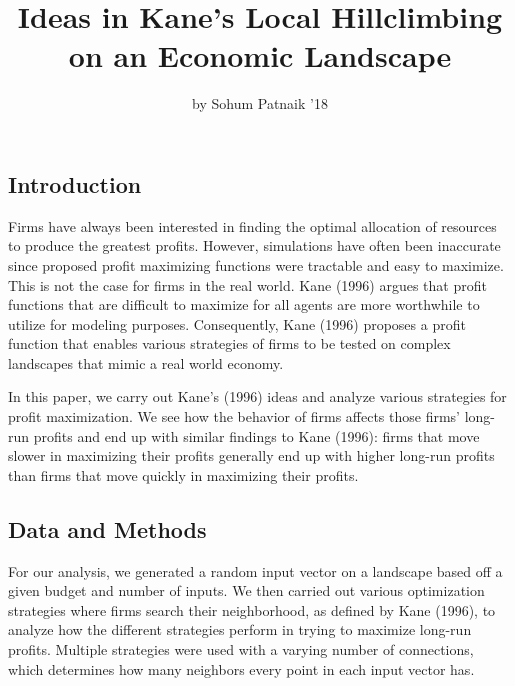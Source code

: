 \title{Ideas in Kane's Local Hillclimbing on an Economic Landscape}
\author{by Sohum Patnaik '18}

\maketitle


\subsection{Introduction}\label{introduction}

Firms have always been interested in finding the optimal allocation of
resources to produce the greatest profits. However, simulations have
often been inaccurate since proposed profit maximizing functions were
tractable and easy to maximize. This is not the case for firms in the
real world. Kane (1996) argues that profit functions that are difficult
to maximize for all agents are more worthwhile to utilize for modeling
purposes. Consequently, Kane (1996) proposes a profit function that
enables various strategies of firms to be tested on complex landscapes
that mimic a real world economy.

In this paper, we carry out Kane's (1996) ideas and analyze various
strategies for profit maximization. We see how the behavior of firms
affects those firms' long-run profits and end up with similar findings
to Kane (1996): firms that move slower in maximizing their profits
generally end up with higher long-run profits than firms that move
quickly in maximizing their profits.

\subsection{Data and Methods}\label{data-and-methods}

For our analysis, we generated a random input vector on a landscape
based off a given budget and number of inputs. We then carried out
various optimization strategies where firms search their neighborhood,
as defined by Kane (1996), to analyze how the different strategies
perform in trying to maximize long-run profits. Multiple strategies were
used with a varying number of connections, which determines how many
neighbors every point in each input vector has.

